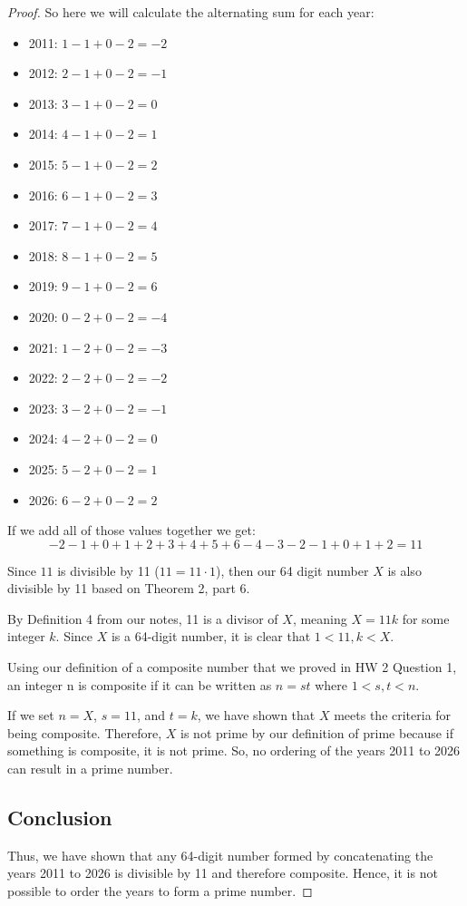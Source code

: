 \documentclass[answers]{exam}
\begin{document}
\begin{questions}
\begin{solution}
\begin{proof}
		So here we will calculate the alternating sum for each year:
		\begin{itemize}
			\item 2011: $1 - 1 + 0 - 2 = -2$
			\item 2012: $2 - 1 + 0 - 2 = -1$
			\item 2013: $3 - 1 + 0 - 2 = 0$
			\item 2014: $4 - 1 + 0 - 2 = 1$
			\item 2015: $5 - 1 + 0 - 2 = 2$
			\item 2016: $6 - 1 + 0 - 2 = 3$
			\item 2017: $7 - 1 + 0 - 2 = 4$
			\item 2018: $8 - 1 + 0 - 2 = 5$
			\item 2019: $9 - 1 + 0 - 2 = 6$
			\item 2020: $0 - 2 + 0 - 2 = -4$
			\item 2021: $1 - 2 + 0 - 2 = -3$
			\item 2022: $2 - 2 + 0 - 2 = -2$
			\item 2023: $3 - 2 + 0 - 2 = -1$
			\item 2024: $4 - 2 + 0 - 2 = 0$
			\item 2025: $5 - 2 + 0 - 2 = 1$
			\item 2026: $6 - 2 + 0 - 2 = 2$
		\end{itemize}

		If we add all of those values together we get:
		$$ -2 - 1 + 0 + 1 + 2 + 3 + 4 + 5 + 6 - 4 - 3 - 2 - 1 + 0 + 1 + 2 = 11$$

		Since $11$ is divisible by 11 ($11 = 11 \cdot 1$), then our 64 digit number $X$ is also divisible by 11 based on Theorem 2, part 6.

		By Definition 4 from our notes, 11 is a divisor of $X$, meaning $X = 11k$ for some integer $k$. Since $X$ is a 64-digit number, it is clear that $1 < 11, k < X$. 

		Using our definition of a composite number that we proved in HW 2 Question 1, an integer n is composite if it can be written as $n = st$ where $1 < s, t < n$.

		If we set $n=X$, $s=11$, and $t=k$, we have shown that $X$ meets the criteria for being composite. Therefore, $X$ is not prime by our definition of prime because if something is composite, it is not prime. So, no ordering of the years 2011 to 2026 can result in a prime number.

		\subsection*{Conclusion}
		Thus, we have shown that any 64-digit number formed by concatenating the years 2011 to 2026 is divisible by 11 and therefore composite. Hence, it is not possible to order the years to form a prime number.
					
			\end{proof}
			\end{solution}
			
			
		\end{questions}
\end{document}
